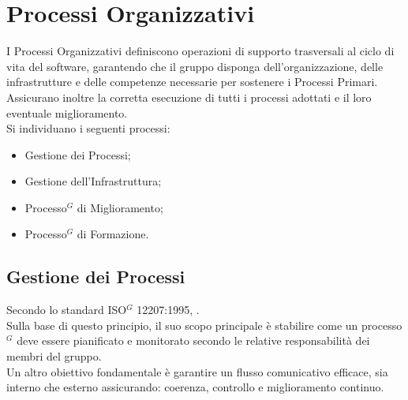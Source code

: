\section{Processi Organizzativi}
I Processi Organizzativi definiscono operazioni di supporto trasversali al ciclo di vita del software, garantendo che il gruppo disponga dell'organizzazione, delle infrastrutture e delle competenze necessarie per sostenere i Processi Primari. Assicurano inoltre la corretta esecuzione di tutti i processi adottati e il loro eventuale miglioramento.\\
Si individuano i seguenti processi:
\begin{itemize}[itemsep=3pt, parsep=1pt, label=$\scriptstyle\bullet$]
    \item Gestione dei Processi;
    \item Gestione dell'Infrastruttura;
    \item Processo$^G$ di Miglioramento;
    \item Processo$^G$ di Formazione.
\end{itemize}

\subsection{Gestione dei Processi}
Secondo lo standard ISO$^G$ 12207:1995, .\\
Sulla base di questo principio, il suo scopo principale è stabilire come un processo$^G$ deve essere pianificato e monitorato secondo le relative responsabilità dei membri del gruppo.\\
Un altro obiettivo fondamentale è garantire un flusso comunicativo efficace, sia interno che esterno assicurando: coerenza, controllo e miglioramento continuo.

